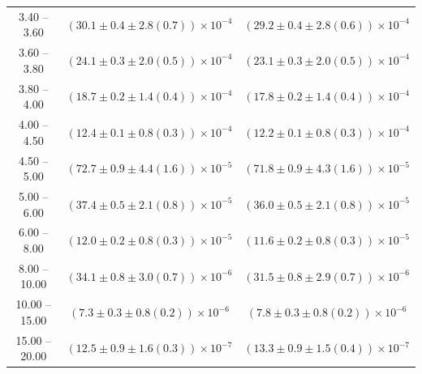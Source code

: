\begin{table}
\begin{center}
\begin{tabular}{ c | c c }
3.40 -- 3.60 & $(30.1\pm0.4\pm2.8(0.7))\times10^{-4}$ & $(29.2\pm0.4\pm2.8(0.6))\times10^{-4}$ \\ 
3.60 -- 3.80 & $(24.1\pm0.3\pm2.0(0.5))\times10^{-4}$ & $(23.1\pm0.3\pm2.0(0.5))\times10^{-4}$ \\ 
3.80 -- 4.00 & $(18.7\pm0.2\pm1.4(0.4))\times10^{-4}$ & $(17.8\pm0.2\pm1.4(0.4))\times10^{-4}$ \\ 
4.00 -- 4.50 & $(12.4\pm0.1\pm0.8(0.3))\times10^{-4}$ & $(12.2\pm0.1\pm0.8(0.3))\times10^{-4}$ \\ 
4.50 -- 5.00 & $(72.7\pm0.9\pm4.4(1.6))\times10^{-5}$ & $(71.8\pm0.9\pm4.3(1.6))\times10^{-5}$ \\ 
5.00 -- 6.00 & $(37.4\pm0.5\pm2.1(0.8))\times10^{-5}$ & $(36.0\pm0.5\pm2.1(0.8))\times10^{-5}$ \\ 
6.00 -- 8.00 & $(12.0\pm0.2\pm0.8(0.3))\times10^{-5}$ & $(11.6\pm0.2\pm0.8(0.3))\times10^{-5}$ \\ 
8.00 -- 10.00 & $(34.1\pm0.8\pm3.0(0.7))\times10^{-6}$ & $(31.5\pm0.8\pm2.9(0.7))\times10^{-6}$ \\ 
10.00 -- 15.00 & $(7.3\pm0.3\pm0.8(0.2))\times10^{-6}$ & $(7.8\pm0.3\pm0.8(0.2))\times10^{-6}$ \\ 
15.00 -- 20.00 & $(12.5\pm0.9\pm1.6(0.3))\times10^{-7}$ & $(13.3\pm0.9\pm1.5(0.4))\times10^{-7}$ \\ 
\hline
\end{tabular}
\end{center}
\end{table}
 

